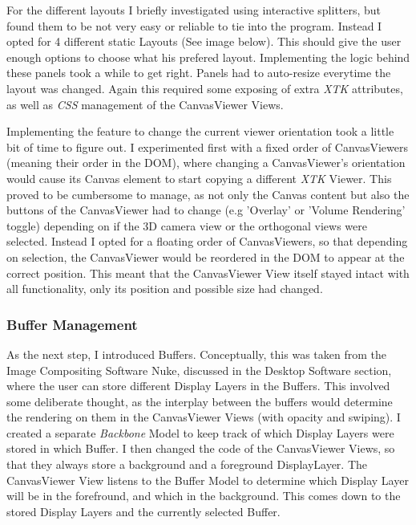 \documentclass[a4paper,11pt,twoside]{article}
\begin{document}
For the different layouts I briefly investigated using interactive splitters, but found them to be not very easy or reliable to tie into the program. Instead I opted for 4 different static Layouts (See image below). This should give the user enough options to choose what his prefered layout. Implementing the logic behind these panels took a while to get right. Panels had to auto-resize everytime the layout was changed. Again this required some exposing of extra \textit{XTK} attributes, as well as \textit{CSS} management of the CanvasViewer Views.

Implementing the feature to change the current viewer orientation took a little bit of time to figure out. I experimented first with a fixed order of CanvasViewers (meaning their order in the DOM), where changing a CanvasViewer's orientation would cause its Canvas element to start copying a different \textit{XTK} Viewer. This proved to be cumbersome to manage, as not only the Canvas content but also the buttons of the CanvasViewer had to change (e.g 'Overlay' or 'Volume Rendering' toggle) depending on if the 3D camera view or the orthogonal views were selected. Instead I opted for a floating order of CanvasViewers, so that depending on selection, the CanvasViewer would be reordered in the DOM to appear at the correct position. This meant that the CanvasViewer View itself stayed intact with all functionality, only its position and possible size had changed.


\subsubsection{Buffer Management}

As the next step, I introduced Buffers. Conceptually, this was taken from the Image Compositing Software Nuke, discussed in the Desktop Software section, where the user can store different Display Layers in the Buffers. This involved some deliberate thought, as the interplay between the buffers would determine the rendering on them in the CanvasViewer Views (with opacity and swiping). I created a separate \textit{Backbone} Model to keep track of which Display Layers were stored in which Buffer. I then changed the code of the CanvasViewer Views, so that they always store a background and a foreground DisplayLayer. The CanvasViewer View listens to the Buffer Model to determine which Display Layer will be in the forefround, and which in the background. This comes down to the stored Display Layers and the currently selected Buffer. 
\end{document}
